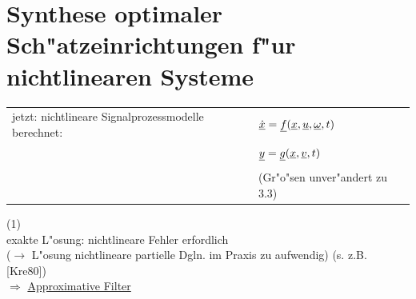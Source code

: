 \documentclass[openany,a4paper,11pt]{book}
\begin{document}
\section{Synthese optimaler Sch"atzeinrichtungen f"ur nichtlinearen Systeme}
\begin{tabular}{ll}
    jetzt: nichtlineare Signalprozessmodelle berechnet: & $\uline{\dot{x}}=\uline{f}(\uline{x},\uline{u},\uline{\omega},t)$\\
    & $\uline{y}=\uline{g}(\uline{x},\uline{v},t)$\\&\\
    & (Gr"o"sen unver"andert zu 3.3)
\end{tabular} \quad (1)\\[3pt]
exakte L"osung: nichtlineare Fehler erfordlich\\
($\rightarrow$ L"osung nichtlineare partielle Dgln. im Praxis zu aufwendig) (s. z.B. [Kre80])\\
$\Rightarrow$ \uline{Approximative Filter}
\end{document}
